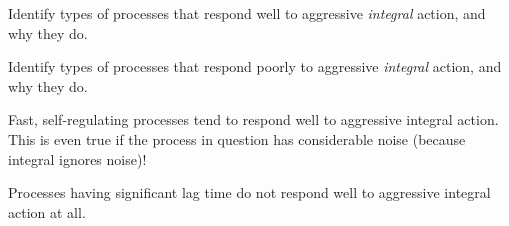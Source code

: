 

Identify types of processes that respond well to aggressive {\it integral} action, and why they do.

\vskip 200pt

Identify types of processes that respond poorly to aggressive {\it integral} action, and why they do.

\vfil

\eject






Fast, self-regulating processes tend to respond well to aggressive integral action.  This is even true if the process in question has considerable noise (because integral ignores noise)!

\vskip 10pt

Processes having significant lag time do not respond well to aggressive integral action at all.











